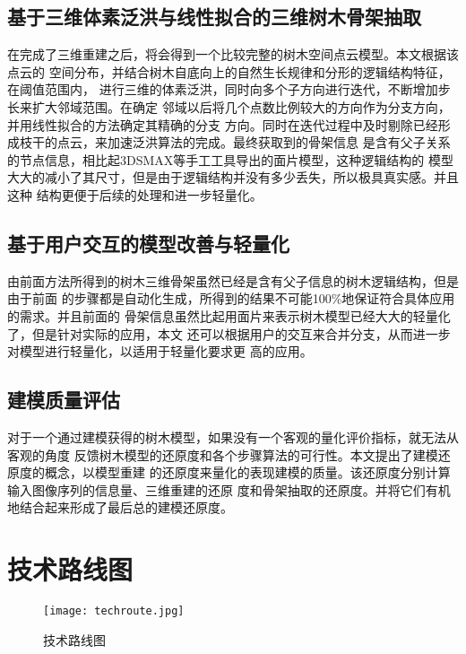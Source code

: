 \subsection{基于三维体素泛洪与线性拟合的三维树木骨架抽取}
\label{subsec:treesklextract}
在完成了三维重建之后，将会得到一个比较完整的树木空间点云模型。本文根据该点云的
空间分布，并结合树木自底向上的自然生长规律和分形的逻辑结构特征，在阈值范围内，
进行三维的体素泛洪，同时向多个子方向进行迭代，不断增加步长来扩大邻域范围。在确定
邻域以后将几个点数比例较大的方向作为分支方向，并用线性拟合的方法确定其精确的分支
方向。同时在迭代过程中及时剔除已经形成枝干的点云，来加速泛洪算法的完成。最终获取到的骨架信息
是含有父子关系的节点信息，相比起3DSMAX等手工工具导出的面片模型，这种逻辑结构的
模型大大的减小了其尺寸，但是由于逻辑结构并没有多少丢失，所以极具真实感。并且这种
结构更便于后续的处理和进一步轻量化。

\subsection{基于用户交互的模型改善与轻量化}
\label{subsec:userinteraction}
由前面方法所得到的树木三维骨架虽然已经是含有父子信息的树木逻辑结构，但是由于前面
的步骤都是自动化生成，所得到的结果不可能100\%地保证符合具体应用的需求。并且前面的
骨架信息虽然比起用面片来表示树木模型已经大大的轻量化了，但是针对实际的应用，本文
还可以根据用户的交互来合并分支，从而进一步对模型进行轻量化，以适用于轻量化要求更
高的应用。

\subsection{建模质量评估}
\label{subsec:qualityevaluation}
对于一个通过建模获得的树木模型，如果没有一个客观的量化评价指标，就无法从客观的角度
反馈树木模型的还原度和各个步骤算法的可行性。本文提出了建模还原度的概念，以模型重建
的还原度来量化的表现建模的质量。该还原度分别计算输入图像序列的信息量、三维重建的还原
度和骨架抽取的还原度。并将它们有机地结合起来形成了最后总的建模还原度。

\section{技术路线图}
\label{sec:techrouteimg}
\begin{figure}[H]
	\centering
	\texttt{[image: techroute.jpg]}
	\caption{技术路线图}
	\label{fig:techroute}
\end{figure}

